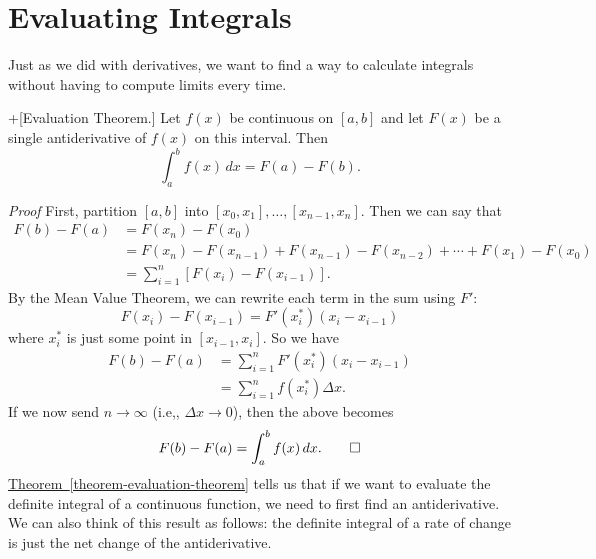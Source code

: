 \documentclass[10pt,]{book}
\makeatletter
\theoremstyle{ptxplainnotitle}
\theoremstyle{ptxplaintitle}
\theoremstyle{ptxplainnotitle}
\theoremstyle{ptxplaintitle}
\theoremstyle{ptxplainnotitle}
\theoremstyle{ptxplaintitle}
\renewcommand*{\proofname}{Proof}
\renewenvironment{proof}[1][\proofname]{\par
  \pushQED{\qed}%
  \normalfont \topsep6\p@\@plus6\p@\relax
  \trivlist
  \item\relax
    {\itshape
    #1\@addpunct{.}}\hspace\labelsep\ignorespaces
}{%
  \popQED\endtrivlist\@endpefalse
}
\theoremstyle{ptxdefinitionnotitle}
\theoremstyle{ptxdefinitiontitle}
\theoremstyle{ptxdefinitionnotitle}
\theoremstyle{ptxdefinitiontitle}
\theoremstyle{ptxdefinitionnotitle}
\theoremstyle{ptxdefinitiontitle}
\theoremstyle{ptxdefinitionnotitle}
\theoremstyle{ptxdefinitiontitle}
\theoremstyle{ptxdefinitionnotitle}
\theoremstyle{ptxdefinitiontitle}
\numberwithin{equation}{section}
\makeatother
\begin{document}
\section[{Evaluating Integrals}]{Evaluating Integrals}\label{section-evaluating-integrals}
\hypertarget{p-443}{}%
Just as we did with derivatives, we want to find a way to calculate integrals without having to compute limits every time.%
\begin{theorem}+[{Evaluation Theorem.}]\label{theorem-evaluation-theorem}
\hypertarget{p-444}{}%
Let \(f(x)\) be continuous on \([a,b]\) and let \(F(x)\) be a single antiderivative of \(f(x)\) on this interval. Then%
\begin{equation*}
\int_{a}^{b}f(x)\,dx = F(a) - F(b).
\end{equation*}
%
\end{theorem}
\begin{proof}\hypertarget{proof-10}{}
\hypertarget{p-445}{}%
First, partition \([a,b]\) into \([x_{0},x_{1}],\ldots,[x_{n-1},x_{n}]\). Then we can say that%
\begin{align*}
F(b) - F(a) & = F(x_{n}) - F(x_{0}) \\
& = F(x_{n}) - F(x_{n-1}) + F(x_{n-1}) - F(x_{n-2}) + \cdots + F(x_{1}) - F(x_{0}) \\
& = \sum_{i=1}^{n}[F(x_{i}) - F(x_{i-1})]. 
\end{align*}
By the Mean Value Theorem, we can rewrite each term in the sum using \(F'\):%
\begin{equation*}
F(x_{i}) - F(x_{i-1}) = F'(x_{i}^{*})(x_{i} - x_{i-1})
\end{equation*}
where \(x_{i}^{*}\) is just some point in \([x_{i-1},x_{i}]\). So we have%
\begin{align*}
F(b) - F(a) & = \sum_{i=1}^{n}F'(x_{i}^{*})(x_{i} - x_{i-1}) \\
& = \sum_{i=1}^{n}f(x_{i}^{*})\Delta x. 
\end{align*}
If we now send \(n\to\infty\) (i.e,, \(\Delta x\to 0\)), then the above becomes%
\begin{equation*}
F(b) - F(a) = \int_{a}^{b}f(x)\,dx.\qedhere
\end{equation*}
%
\end{proof}
\hypertarget{p-446}{}%
\hyperref[theorem-evaluation-theorem]{Theorem~\ref{theorem-evaluation-theorem}} tells us that if we want to evaluate the definite integral of a continuous function, we need to first find an antiderivative. We can also think of this result as follows: the definite integral of a rate of change is just the net change of the antiderivative.%
\end{document}
